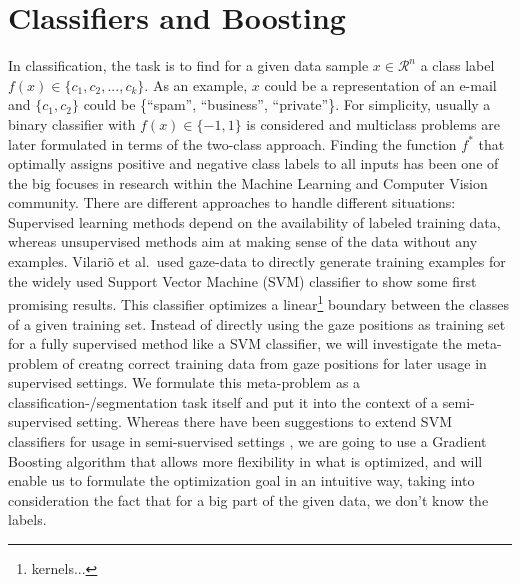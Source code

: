 \section{Classifiers and Boosting}
In classification, the task is to find for a given data sample $x \in \mathcal{R}^n$ a class label $f(x) \in \{c_1, c_2, ..., c_k\}$. As an example, $x$ could be a representation of an e-mail and $\{c_1,c_2\}$ could be \{``spam'', ``business'', ``private''\}. For simplicity, usually a binary classifier with $f(x) \in \{-1,1\}$ is considered and multiclass problems are later formulated in terms of the two-class approach.  
Finding the function $f^*$ that optimally assigns positive and negative class labels to all inputs has been one of the big focuses in research within the Machine Learning and Computer Vision community. There are different approaches to handle different situations: Supervised learning methods depend on the availability of labeled training data, whereas unsupervised methods aim at making sense of the data without any examples. Vilari\~o et al.\ used gaze-data to directly generate training examples for the widely used Support Vector Machine (SVM) classifier to show some first promising results. 
This classifier optimizes a linear\footnote{kernels...} boundary between the classes of a given training set. Instead of directly using the gaze positions as training set for a fully supervised method like a SVM classifier, we will investigate the meta-problem of creatng correct training data from gaze positions for later usage in supervised settings. 
We formulate this meta-problem as a classification-/segmentation task itself and put it into the context of a semi-supervised setting. 
Whereas there have been suggestions to extend SVM classifiers for usage in semi-suervised settings , we are going to use a Gradient Boosting algorithm that allows more flexibility in what is optimized, and will enable us to formulate the optimization goal in an intuitive way, taking into consideration the fact that for a big part of the given data, we don't know the labels.


